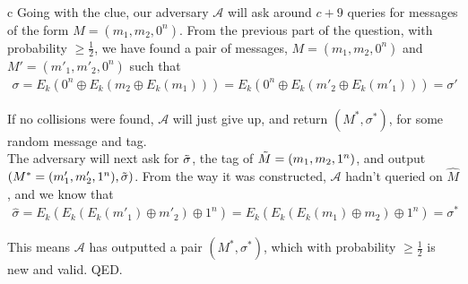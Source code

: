 \documentclass{article}
\begin{document}
\begin{paragraph}
    c Going with the clue, our adversary $\mathcal{A}$ will ask around $c + 9$ queries for messages of the form $M = (m_1, m_2, 0^n)$. From the previous part of the question, with probability $\geq \frac{1}{2}$, we have found a pair of messages, $M = (m_1, m_2, 0^n)$ and $M' = (m'_1, m'_2, 0^n)$ such that
    \begin{align*}
        \sigma = E_k(0^n \oplus E_k(m_2 \oplus E_k(m_1))) = E_k(0^n \oplus E_k(m'_2 \oplus E_k(m'_1))) = \sigma'
    \end{align*}
    
    If no collisions were found, $\mathcal{A}$ will just give up, and return $(M^*, \sigma^*)$, for some random message and tag.\\
    
    The adversary will next ask for $\Tilde{\sigma}$, the tag of $\Tilde{M} = (m_1, m_2, 1^n)$, and output $\left(M^* = (m'_1, m'_2, 1^n), \Tilde{\sigma}\right)$. From the way it was constructed, $\mathcal{A}$ hadn't queried on $\hat{M}$, and we know that
    \begin{align*}
        \hat{\sigma} = E_k(E_k(E_k(m'_1) \oplus m'_2) \oplus 1^n) = E_k(E_k(E_k(m_1) \oplus m_2) \oplus 1^n) = \sigma^*
    \end{align*}
    
    This means $\mathcal{A}$ has outputted a pair $(M^*, \sigma^*)$, which with probability $\geq \frac{1}{2}$ is new and valid. QED.
\end{paragraph}
\end{document}

